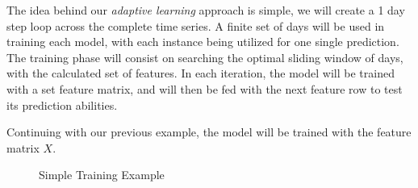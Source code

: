 \documentclass[12pt]{report} %
\begin{document}

The idea behind our \textit{adaptive learning} approach is simple, we will create a 1 day step loop across the complete time series. A finite set of days will be used in training each model, with each instance being utilized for one single prediction. The training phase will consist on searching the optimal sliding window of days, with the calculated set of features. In each iteration, the model will be trained with a set feature matrix, and will then be fed with the next feature row to test its prediction abilities.

Continuing with our previous example, the model will be trained with the feature matrix $\mathit{X}$.

\begin{figure}[H]
    \centering
    \caption{Simple Training Example}
    \label{fig:train_example}
\end{figure}
\end{document}
